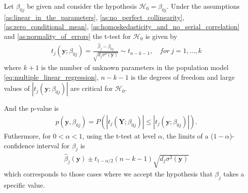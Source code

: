 \begin{theorem}  \label{th:t_distribution}
Let $\beta_{0j}$ be given and consider the hypothesis $\mathcal{H}_0=\beta_{0j}$. Under the assumptions \ref{as:linear_in_the_parameters}, \ref{as:no_perfect_collinearity}, \ref{as:zero_conditional_mean}, \ref{as:homoskedasticity_and_no_serial_correlation} and \ref{as:normality_of_errors} the t-test for $\mathcal{H}_0$ is given by
\begin{align}
   t_j(\textbf{y};\beta_{0j}) = \frac{\hat{\beta}_j - \beta_{0j}}{\sqrt{d_j\sigma^2(\textbf{y})}}\sim t_{n-k-1}, \quad for \ j=1,\ldots,k
\end{align}
where $k+1$ is the number of unknown parameters in the population model \eqref{eq:multiple_linear_regression}, $n-k-1$ is the degrees of freedom and large values of $|t_j(\textbf{y};\beta_{0j})|$ are critical for $\mathcal{H}_0$.

And the p-value is
\begin{align}
    p(\textbf{y},\beta_{0j})=P(|t_j(\textbf{Y};\beta_{0j})|\leq |t_j(\textbf{y};\beta_{0j})|).
\end{align}
Futhermore, for $0<\alpha<1$, using the t-test at level $\alpha$, the limits of a ($1-\alpha$)-confidence interval for $\beta_j$ is
\begin{align} \label{eq:t_statistic}
    \hat{\beta}_{j}(\textbf{y}) \pm t_{1-\alpha/2}(n-k-1)\sqrt{d_j\sigma^2(\textbf{y})}
\end{align}
which corresponds to those cases where we accept the hypothesis that $\beta_j$ takes a specific value.
\end{theorem}
